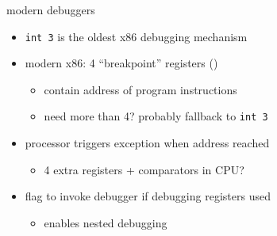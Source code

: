 
\begin{frame}{modern debuggers}
    \begin{itemize}
    \item {\tt int 3} is the oldest x86 debugging mechanism
    \item modern x86: 4 ``breakpoint'' registers ()
        \begin{itemize}
        \item contain address of program instructions
        \item need more than 4? probably fallback to \texttt{int 3}
        \end{itemize}
    \item processor triggers exception when address reached
        \begin{itemize}
        \item 4 extra registers + comparators in CPU?
        \end{itemize}
    \item flag to invoke debugger if debugging registers used
        \begin{itemize}
        \item enables nested debugging
        \end{itemize}
    \end{itemize}
\end{frame}
